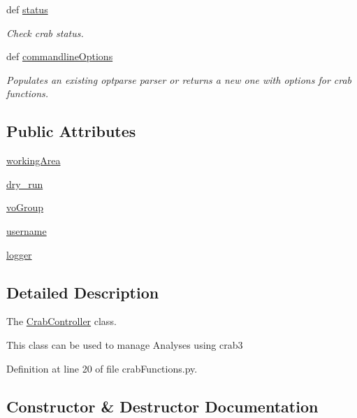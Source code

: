 \begin{DoxyCompactItemize}
def \hyperlink{classcrabFunctions_1_1CrabController_a094930ed227396b90696ca2fc2e986ed}{status}
\begin{DoxyCompactList}\small\item\em Check crab status. \end{DoxyCompactList}\item 
def \hyperlink{classcrabFunctions_1_1CrabController_ae7c8115bdb0a74c859404641f91cb584}{commandline\-Options}
\begin{DoxyCompactList}\small\item\em Populates an existing optparse parser or returns a new one with options for crab functions. \end{DoxyCompactList}\end{DoxyCompactItemize}
\subsection*{Public Attributes}
\begin{DoxyCompactItemize}
\item 
\hyperlink{classcrabFunctions_1_1CrabController_a95c64682d53afcd3c0d6f3794f12c86a}{working\-Area}
\item 
\hyperlink{classcrabFunctions_1_1CrabController_a8e6640715c27f45e9a0c66c3efe0aa4d}{dry\-\_\-run}
\item 
\hyperlink{classcrabFunctions_1_1CrabController_a5aabe7cb586e56f190dc76228622d961}{vo\-Group}
\item 
\hyperlink{classcrabFunctions_1_1CrabController_a9e8b5ce5d1107334feed2e4bee2ba109}{username}
\item 
\hyperlink{classcrabFunctions_1_1CrabController_aeec5322c1cb1012abdde8ae71abd0f44}{logger}
\end{DoxyCompactItemize}


\subsection{Detailed Description}
The \hyperlink{classcrabFunctions_1_1CrabController}{Crab\-Controller} class. 

This class can be used to manage Analyses using crab3 

Definition at line 20 of file crab\-Functions.\-py.



\subsection{Constructor \& Destructor Documentation}
